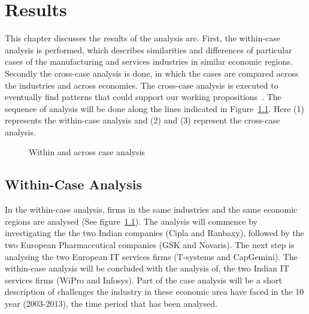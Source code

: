 \chapter{Results}\label{ch:Result}%
This chapter discusses the results of the analysis are.
First, the within-case analysis is performed, which describes similarities and differences of  particular cases of the manufacturing and services industries in similar economic regions.
Secondly the cross-case analysis is done, in which the cases are compared across the industries and across economies.
The cross-case analysis is executed to eventually find patterns that could support our working propositions~\citep{Eisenhardt:1989ww}.
The sequence of analysis will  be done along the lines indicated in Figure~\ref{fig:Case_Analysis}.
Here (1) represents the within-case analysis and (2) and (3) represent the cross-case analysis.

\begin{figure}[ht!]
\centering
{}
 \caption{Within and across case analysis}\label{fig:Case_Analysis}
\end{figure}



\section{Within-Case Analysis}
In the within-case analysis, firms in the same industries and the same economic regions are analysed (See figure~\ref{fig:Case_Analysis}). 
The analysis will commence by investigating the the two Indian \pharma companies (Cipla and Ranbaxy), followed by the two European Pharmaceutical companies (GSK and Novaris).
The next step is  analysing the two European IT services firms (T-systems and CapGemini).
The within-case analysis will be concluded with the analysis of, the two Indian IT services firms (WiPro and Infosys).
Part of the case analysis will be a short description of challenges the industry in these economic area have faced in the 10 year (2003-2013), the time period that has been analysed.

